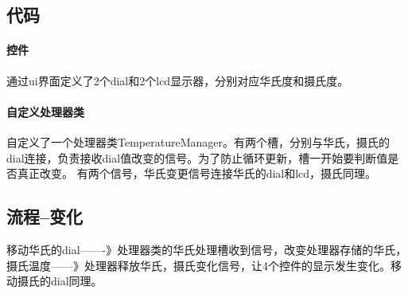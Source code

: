 \documentclass{article}
\begin{document}
\begin{CJK}{UTF8}{gkai}
\subsection{代码} 
\paragraph{控件}通过ui界面定义了2个dial和2个lcd显示器，分别对应华氏度和摄氏度。 
\paragraph{自定义处理器类}自定义了一个处理器类TemperatureManager。有两个槽，分别与华氏，摄氏的dial连接，负责接收dial值改变的信号。为了防止循环更新，槽一开始要判断值是否真正改变。
有两个信号，华氏变更信号连接华氏的dial和lcd，摄氏同理。
\subsection{流程--变化}移动华氏的dial-------》处理器类的华氏处理槽收到信号，改变处理器存储的华氏，摄氏温度------》处理器释放华氏，摄氏变化信号，让4个控件的显示发生变化。移动摄氏的dial同理。
\end{CJK}
\end{document}
